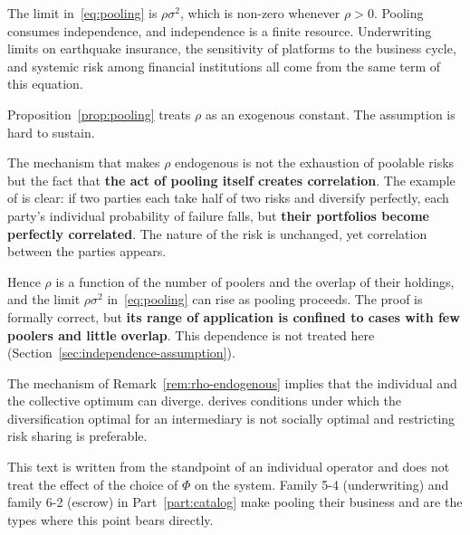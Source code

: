 \begin{remark}
\label{rem:independence-finite}
The limit in~\eqref{eq:pooling} is $\rho\sigma^2$, which is non-zero whenever $\rho>0$.
Pooling consumes independence, and independence is a finite resource.
Underwriting limits on earthquake insurance, the sensitivity of platforms to the business
cycle, and systemic risk among financial institutions all come from the same term of this
equation.
\end{remark}

\begin{remark}
\label{rem:rho-endogenous}
Proposition~\ref{prop:pooling} treats $\rho$ as an exogenous constant. The assumption is
hard to sustain.

The mechanism that makes $\rho$ endogenous is not the exhaustion of poolable risks but the
fact that \textbf{the act of pooling itself creates correlation}. The example of
\cite{wagner2010} is clear: if two parties each take half of two risks and diversify
perfectly, each party's individual probability of failure falls, but
\textbf{their portfolios become perfectly correlated}. The nature of the risk is unchanged,
yet correlation between the parties appears.

Hence $\rho$ is a function of the number of poolers and the overlap of their holdings, and
the limit $\rho\sigma^2$ in~\eqref{eq:pooling} can rise as pooling proceeds. The proof is
formally correct, but \textbf{its range of application is confined to cases with few poolers
and little overlap}. This dependence is not treated here
(Section~\ref{sec:independence-assumption}).
\end{remark}

\begin{remark}
\label{rem:pooling-social}
The mechanism of Remark~\ref{rem:rho-endogenous} implies that the individual and the
collective optimum can diverge. \cite{ibragimov2011} derives conditions under which the
diversification optimal for an intermediary is not socially optimal and restricting risk
sharing is preferable.

This text is written from the standpoint of an individual operator and does not treat the
effect of the choice of $\Phi$ on the system. Family 5-4 (underwriting) and family 6-2
(escrow) in Part~\ref{part:catalog} make pooling their business and are the types where
this point bears directly.
\end{remark}


